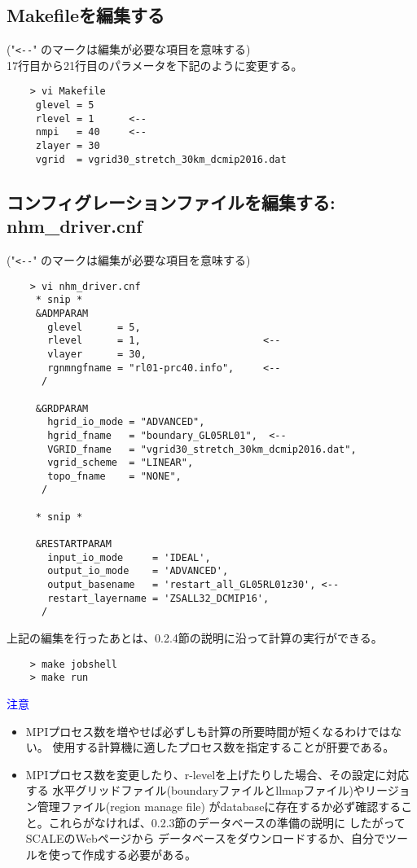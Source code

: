 \subsection{Makefileを編集する}
 ("\verb|<--|" のマークは編集が必要な項目を意味する) \\
 17行目から21行目のパラメータを下記のように変更する。
 \begin{verbatim}
    > vi Makefile
     glevel = 5
     rlevel = 1      <--
     nmpi   = 40     <--
     zlayer = 30
     vgrid  = vgrid30_stretch_30km_dcmip2016.dat
 \end{verbatim}

\subsection{コンフィグレーションファイルを編集する: nhm\_driver.cnf}
 ("\verb|<--|" のマークは編集が必要な項目を意味する)
 \begin{verbatim}
    > vi nhm_driver.cnf
     * snip *
     &ADMPARAM
       glevel      = 5,
       rlevel      = 1,                     <--
       vlayer      = 30,
       rgnmngfname = "rl01-prc40.info",     <--
      /

     &GRDPARAM
       hgrid_io_mode = "ADVANCED",
       hgrid_fname   = "boundary_GL05RL01",  <--
       VGRID_fname   = "vgrid30_stretch_30km_dcmip2016.dat",
       vgrid_scheme  = "LINEAR",
       topo_fname    = "NONE",
      /

     * snip *

     &RESTARTPARAM
       input_io_mode     = 'IDEAL',
       output_io_mode    = 'ADVANCED',
       output_basename   = 'restart_all_GL05RL01z30', <--
       restart_layername = 'ZSALL32_DCMIP16',
      /
 \end{verbatim}

 \noindent 上記の編集を行ったあとは、0.2.4節の説明に沿って計算の実行ができる。
 \begin{verbatim}
    > make jobshell
    > make run
 \end{verbatim}

 \noindent \textcolor{blue}{{\sf 注意}}
 \begin{itemize}
   \item MPIプロセス数を増やせば必ずしも計算の所要時間が短くなるわけではない。
           使用する計算機に適したプロセス数を指定することが肝要である。
   \item MPIプロセス数を変更したり、r-levelを上げたりした場合、その設定に対応する
           水平グリッドファイル(boundaryファイルとllmapファイル)やリージョン管理ファイル(region manage file)
           がdatabaseに存在するか必ず確認すること。これらがなければ、0.2.3節のデータベースの準備の説明に
           したがってSCALEのWebページから
           データベースをダウンロードするか、自分でツールを使って作成する必要がある。
 \end{itemize}




